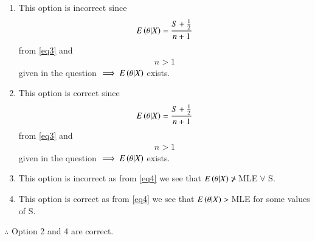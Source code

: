 \documentclass[journal,12pt,twocolumn]{IEEEtran}
\begin{document}
\begin{enumerate}
    \item This option is incorrect since 
    \begin{align*}
        E\left(\theta|X\right) = \frac{S+\frac{1}{2}}{n+1} 
    \end{align*}
       from \eqref{eq3} and
    \begin{align*}
        n>1 
    \end{align*}
    given in the question $\implies E\left(\theta|X\right)$ exists.
    \item This option is correct since 
    \begin{align*}
        E\left(\theta|X\right) = \frac{S+\frac{1}{2}}{n+1} 
    \end{align*}
       from \eqref{eq3} and
    \begin{align*}
        n>1 
    \end{align*}
    given in the question $\implies E\left(\theta|X\right)$ exists.
    \item This option is incorrect as from \eqref{eq4} we see that $E\left(\theta|X\right)\ngtr\, $MLE$\;\forall$ S.
    \item This option is correct as from \eqref{eq4} we see that $E\left(\theta|X\right)>\, $MLE for some values of S.
\end{enumerate}
$\therefore$ Option 2 and 4 are correct.
\end{document}
